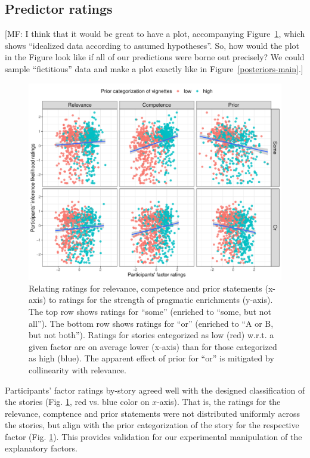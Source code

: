 \documentclass{sp}
\newcommand{\mf}[1]{\textcolor{BurntOrange}{[MF: #1]}}
\begin{document}
\subsection{Predictor ratings}

\mf{I think that it would be great to have a plot, accompanying Figure~\ref{main-raw-ratings}, which shows ``idealized data according to assumed hypotheses''. So, how would the plot in the Figure look like if all of our predictions were borne out precisely? We could sample ``fictitious'' data and make a plot exactly like in Figure~\ref{posteriors-main}.}

\begin{figure}[h]
	\begin{center}
		\includegraphics[width=1\linewidth]{images/byFactor-byPrior-raw-scatter.pdf}
	\end{center}
	\vspace{-0.3cm}
	\caption{Relating ratings for relevance, competence and prior statements (x-axis) to ratings for the strength of pragmatic enrichments (y-axis). The top row shows ratings for “some” (enriched to “some, but not all”). The bottom row shows ratings for “or” (enriched to “A or B, but not both”). Ratings for stories categorized as low (red) w.r.t. a given factor are on average lower (x-axis) than for those categorized as high (blue). The apparent effect of prior for “or” is mitigated by collinearity with relevance.}
	\label{main-raw-ratings}
\end{figure}

Participants’ factor ratings by-story agreed well with the designed classification of the stories (Fig. \ref{main-raw-ratings}, red vs. blue color on $x$-axis). That is, the ratings for the relevance, comptence and prior statements were not distributed uniformly across the stories, but align with the prior categorization of the story for the respective factor (Fig. \ref{main-raw-ratings}). This provides validation for our experimental manipulation of the explanatory factors.
\end{document}
